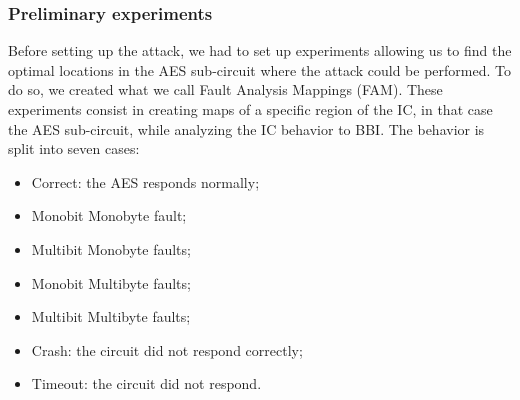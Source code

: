 		\subsubsection{Preliminary experiments}
			Before setting up the attack, we had to set up experiments allowing us to find the optimal locations in the AES sub-circuit where the attack could be performed.
			To do so, we created what we call Fault Analysis Mappings (FAM).
			These experiments consist in creating maps of a specific region of the IC, in that case the AES sub-circuit, while analyzing the IC behavior to BBI.
			The behavior is split into seven cases:
			\begin{itemize}
				\item Correct: the AES responds normally;
				\item Monobit Monobyte fault;
				\item Multibit Monobyte faults;
				\item Monobit Multibyte faults;
				\item Multibit Multibyte faults;
				\item Crash: the circuit did not respond correctly;
				\item Timeout: the circuit did not respond.
			\end{itemize}
	
